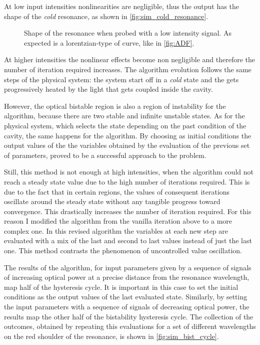 At low input intensities nonlinearities are negligible, thus the output has the shape of the \textit{cold} resonance, as shown in \autoref{fig:sim_cold_resonance}.

\begin{figure}[htbp]
	\centering
	
	\caption{
		Shape of the resonance when probed with a low intensity signal.
		As expected is a lorentzian-type of curve, like in \autoref{fig:ADF}.
	}
	\label{fig:sim_cold_resonance}
\end{figure}

At higher intensities the nonlinear effects become non negligible and therefore the number of iteration required increases.
The algorithm evolution follows the same steps of the physical system: the system start off in a \textit{cold} state and the gets progressively heated by the light that gets coupled inside the cavity.

However, the optical bistable region is also a region of instability for the algorithm, because there are two stable and infinite unstable states.
As for the physical system, which selects the state depending on the past condition of the cavity, the same happens for the algorithm.
By choosing as initial conditions the output values of the the variables obtained by the evaluation of the previous set of parameters, proved to be a successful approach to the problem.

Still, this method is not enough at high intensities, when the algorithm could not reach a steady state value due to the high number of iterations required.
This is due to the fact that in certain regions, the values of consequent iterations oscillate around the steady state without any tangible progress toward convergence.
This drastically increases the number of iteration required.
For this reason I modified the algorithm from the vanilla iteration above to a more complex one.
In this revised algorithm the variables at each new step are evaluated with a mix of the last and second to last values instead of just the last one.
This method contrasts the phenomenon of uncontrolled value oscillation.

The results of the algorithm, for input parameters given by a sequence of signals of increasing optical power at a precise distance from the resonance wavelength, map half of the hysteresis cycle.
It is important in this case to set the initial conditions as the output values of the last evaluated state.
Similarly, by setting the input parameters with a sequence of signals of decreasing optical power, the results map the other half of the bistability hysteresis cycle.
The collection of the outcomes, obtained by repeating this evaluations for a set of different wavelengths on the red shoulder of the resonance, is shown in \autoref{fig:sim_bist_cycle}.

